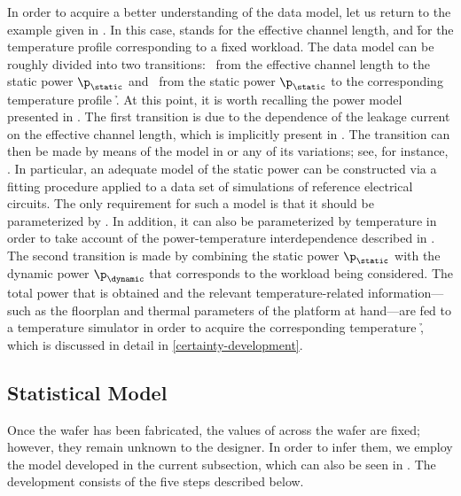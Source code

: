 In order to acquire a better understanding of the data model, let us return to
the example given in . In this case, \g stands for the
effective channel length, and \h for the temperature profile \mq corresponding
to a fixed workload. The data model can be roughly divided into two transitions:
\one~from the effective channel length \g to the static power $\p_\static$ and
\two~from the static power $\p_\static$ to the corresponding temperature profile
\h. At this point, it is worth recalling the power model presented in
. The first transition is due to the dependence of the leakage
current on the effective channel length, which is implicitly present in
. The transition can then be made by means of the model in
 or any of its variations; see, for instance,
\cite{chandrakasan2000, srivastava2010, juan2012}. In particular, an adequate
model of the static power can be constructed via a fitting procedure applied to
a data set of  simulations of reference electrical circuits. The only
requirement for such a model is that it should be parameterized by \g. In
addition, it can also be parameterized by temperature in order to take account
of the power-temperature interdependence described in . The
second transition is made by combining the static power $\p_\static$ with the
dynamic power $\p_\dynamic$ that corresponds to the workload being considered.
The total power that is obtained and the relevant temperature-related
information---such as the floorplan and thermal parameters of the platform at
hand---are fed to a temperature simulator in order to acquire the corresponding
temperature \h, which is discussed in detail in \cref{certainty-development}.

\subsection{Statistical Model}

Once the wafer has been fabricated, the values of \g across the wafer are fixed;
however, they remain unknown to the designer. In order to infer them, we employ
the model developed in the current subsection, which can also be seen in
. The development consists of the five steps
described below.

